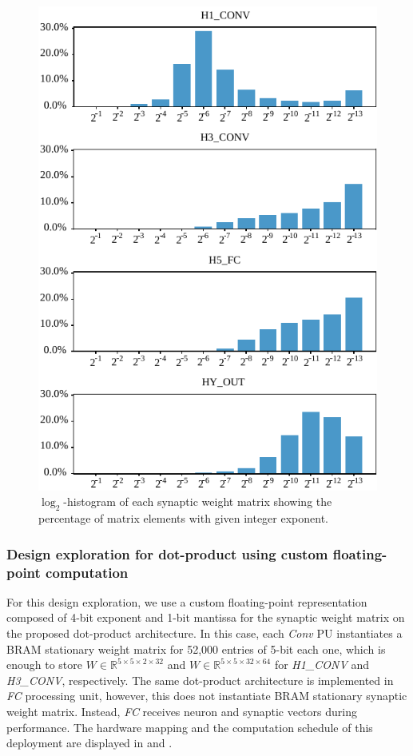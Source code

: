 \begin{figure}[h!]
	\includegraphics[width=\columnwidth]{../figures/log2_histogram.pdf}
	\caption{$\log_2$-histogram of each synaptic weight matrix showing the percentage of matrix elements with given integer exponent.}\label{fig:log2histogram}
\end{figure}

\subsubsection{Design exploration for dot-product using custom floating-point computation}
For this design exploration, we use a custom floating-point representation composed of 4-bit exponent and 1-bit mantissa for the synaptic weight matrix on the proposed dot-product architecture. In this case, each \emph{Conv} PU instantiates a BRAM stationary weight matrix for 52,000 entries of 5-bit each one, which is enough to store $W\in\mathbb{R}^{5\times 5\times 2\times 32}$ and $W\in\mathbb{R}^{5\times 5\times 32\times 64}$ for \emph{H1\_CONV} and \emph{H3\_CONV}, respectively. The same dot-product architecture is implemented in \emph{FC} processing unit, however, this does not instantiate BRAM stationary synaptic weight matrix. Instead, \emph{FC} receives neuron and synaptic vectors during performance. The hardware mapping and the computation schedule of this deployment are displayed in  and .

